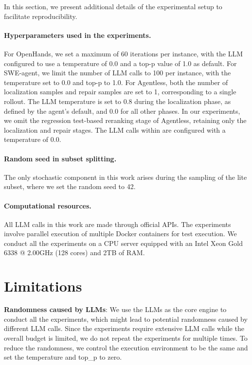 In this section, we present additional details of the experimental setup to facilitate reproducibility.

\paragraph{Hyperparameters used in the experiments.} For OpenHands, we set a maximum of 60 iterations per instance, with the LLM configured to use a temperature of 0.0 and a top-p value of 1.0 as default. For SWE-agent, we limit the number of LLM calls to 100 per instance, with the temperature set to 0.0 and top-p to 1.0. For Agentless, both the number of localization samples and repair samples are set to 1, corresponding to a single rollout. The LLM temperature is set to 0.8 during the localization phase, as defined by the agent’s default, and 0.0 for all other phases. In our experiments, we omit the regression test-based reranking stage of Agentless, retaining only the localization and repair stages. The LLM calls within \method{} are configured with a temperature of 0.0.

\paragraph{Random seed in subset splitting.} The only stochastic component in this work arises during the sampling of the lite subset, where we set the random seed to 42.

\paragraph{Computational resources.} All LLM calls in this work are made through official APIs. The experiments involve parallel execution of multiple Docker containers for test execution. We conduct all the experiments on a CPU server equipped with an Intel Xeon Gold 6338 @ 2.00GHz (128 cores) and 2TB of RAM.

\section{Limitations}
\label{sec:limitations}
\textbf{Randomness caused by LLMs}: We use the LLMs as the core engine to conduct all the experiments, which might lead to potential randomness caused by different LLM calls. Since the experiments require extensive LLM calls while the overall budget is limited, we do not repeat the experiments for multiple times. To reduce the randomness, we control the execution environment to be the same and set the temperature and top\_p to zero. 

